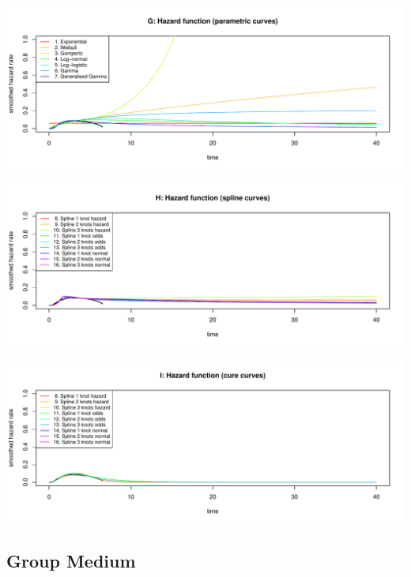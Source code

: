\documentclass[]{article}
\begin{document}
\begin{flushleft}\includegraphics[height=0.29\textheight]{Images/validate_extrapolation1-7} \end{flushleft}

\begin{flushleft}\includegraphics[height=0.29\textheight]{Images/validate_extrapolation1-8} \end{flushleft}

\begin{flushleft}\includegraphics[height=0.29\textheight]{Images/validate_extrapolation1-9} \end{flushleft}

\newpage

\subsection{Group Medium}\label{group-medium}
\end{document}
